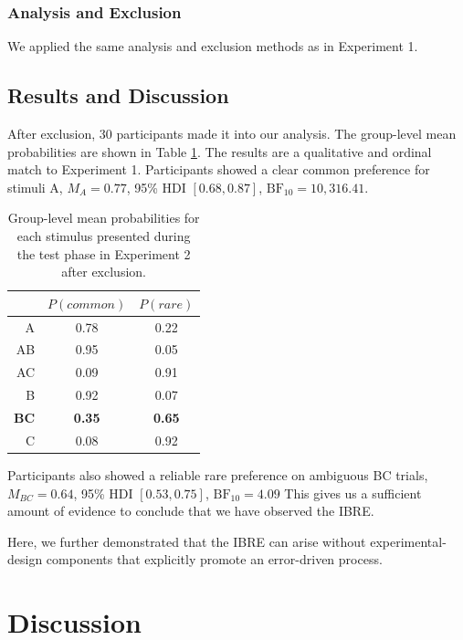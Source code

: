 \documentclass[10pt,letterpaper]{article}
\begin{document}
\subsubsection{Analysis and Exclusion}

We applied the same analysis and exclusion methods as in Experiment 1.

\subsection{Results and Discussion}

After exclusion, 30 participants made it into our analysis.
The group-level mean probabilities are shown in Table \ref{tab:results-exp2}.
The results are a qualitative and ordinal match to Experiment 1.
Participants showed a clear common preference for stimuli A, $M_{A} = 0.77$, 95\% HDI $[0.68, 0.87]$, $\mathrm{BF}_{10} = 10,316.41$.

\begin{table}[H]
  \begin{center}
    \caption{Group-level mean probabilities for each stimulus presented during the test phase in Experiment 2 after exclusion.\\}
    \label{tab:results-exp2}
    \vskip 0.12in
    \begin{tabular}{rcc}
      \hline
       & $P(common)$ & $P(rare)$ \\
      \hline
      A & 0.78 & 0.22  \\
      AB & 0.95 & 0.05 \\
      AC & 0.09 & 0.91 \\
      B & 0.92 & 0.07  \\
      \textbf{BC} & \textbf{0.35} & \textbf{0.65} \\
      C & 0.08 & 0.92 \\
    \end{tabular}
  \end{center}
\end{table}

Participants also showed a reliable rare preference on ambiguous BC trials, $M_{BC} = 0.64$, 95\% HDI $[0.53, 0.75]$, $\mathrm{BF}_{10} = 4.09$
This gives us a sufficient amount of evidence to conclude that we have observed the IBRE.

Here, we further demonstrated that the IBRE can arise without experimental-design components that explicitly promote an error-driven process.

\section{Discussion}
\end{document}

